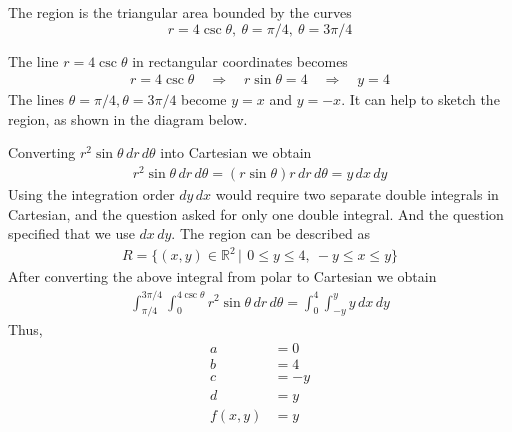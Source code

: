     \ifnum {} 
    {\color{DarkBlue}
    The region is the triangular area bounded by the curves
    $$r = 4\csc\theta, \ \theta  =  \pi/4 , \ \theta = 3\pi/4$$
    
    The line $r=4\csc\theta$ in rectangular coordinates becomes
    \begin{align}
        r=4\csc\theta \quad \Rightarrow \quad r\sin\theta = 4 \quad \Rightarrow \quad y = 4
    \end{align}
    The lines $\theta  = \pi/4 , \theta = 3\pi/4$ become $y=x$ and $y=-x$.  It can help to sketch the region, as shown in the diagram below. 
       \begin{center}     
    \end{center}           
    Converting $r^2\sin\theta\, dr \, d\theta$ into Cartesian we obtain 
    \begin{align}
        r^2\sin\theta \, dr \, d\theta =  (r\sin\theta) r \, dr \, d\theta = y \, dx\,dy
    \end{align}    
    Using the integration order $dy \, dx$ would require two separate double integrals in Cartesian, and the question asked for only one double integral. And the question specified that we use $dx\,dy$. The region can be described as
    \begin{align}
        R = \{ (x,y) \in \mathbb R^2 \, | \, \ 0 \le y \le 4, \ -y\le x \le y \}
    \end{align}
    After converting the above integral from polar to Cartesian we obtain 
    \begin{align}
        \int_{\pi/4}^{3\pi/4}\int_{0}^{4\csc\theta} r^2\sin\theta \, dr \, d\theta = \int_{0}^4 \int_{-y}^y y \, dx \, dy
    \end{align} 
    Thus,
    \begin{align}
        a &= 0 \\
        b &= 4 \\
        c&= -y \\
        d&= y \\
        f(x,y) &= y
    \end{align}
    }
   \else

